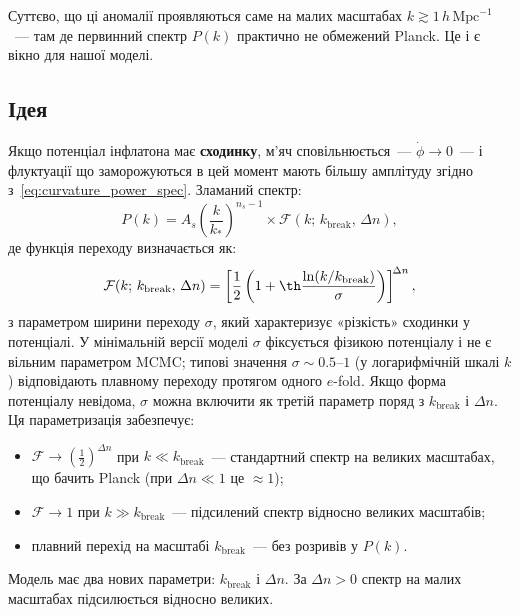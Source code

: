 \documentclass[12pt, a4paper]{article}
\begin{document}
Суттєво, що ці аномалії проявляються саме на малих масштабах
$k \gtrsim 1\,h\,\mathrm{Mpc}^{-1}$~--- там де первинний спектр
$P(k)$ практично не обмежений Planck. Це і є вікно для нашої моделі.

\subsection{Ідея}

Якщо потенціал інфлатона має \textbf{сходинку}, м'яч сповільнюється~---
$\dot{\phi} \to 0$~--- і флуктуації що заморожуються в цей момент
мають більшу амплітуду згідно з~\eqref{eq:curvature_power_spec}.
Зламаний спектр:
\begin{equation}\label{eq:broken_spectrum}
  P(k) = A_s \left(\frac{k}{k_*}\right)^{n_s-1}
  \times \mathcal{F}(k;\, k_\mathrm{break},\, \Delta n),
\end{equation}
де функція переходу визначається як:
\begin{equation}\label{eq:F_def}
  \mathcal{F}(k;\, k_\mathrm{break},\, \Delta n)
  = \left[\frac{1}{2}\left(1 + \th\frac{\ln(k/k_\mathrm{break})}
    {\sigma}\right)\right]^{\!\Delta n},
\end{equation}
з параметром ширини переходу $\sigma$, який характеризує
«різкість» сходинки у потенціалі. У мінімальній версії моделі
$\sigma$ фіксується фізикою потенціалу і не є вільним
параметром MCMC; типові значення $\sigma \sim 0.5$--$1$
(у логарифмічній шкалі $k$) відповідають плавному переходу
протягом одного $e$-fold. Якщо форма потенціалу невідома,
$\sigma$ можна включити як третій параметр поряд з
$k_\mathrm{break}$ і $\Delta n$. Ця параметризація забезпечує:
\begin{itemize}
  \item $\mathcal{F} \to \left(\tfrac{1}{2}\right)^{\Delta n}$
        при $k \ll k_\mathrm{break}$~---
        стандартний спектр на великих масштабах, що бачить Planck
        (при $\Delta n \ll 1$ це $\approx 1$);
  \item $\mathcal{F} \to 1$ при $k \gg k_\mathrm{break}$~---
        підсилений спектр відносно великих масштабів;
  \item плавний перехід на масштабі $k_\mathrm{break}$~---
        без розривів у $P(k)$.
\end{itemize}
Модель має два нових параметри: $k_\mathrm{break}$ і $\Delta n$.
За $\Delta n > 0$ спектр на малих масштабах підсилюється відносно великих.
\end{document}
